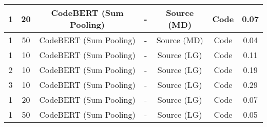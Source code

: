 \begin{longtable}{|c|c|c|c|c|c|c|}
\hline
1 & 20 & CodeBERT (Sum Pooling) & - & Source (MD) & Code & 0.07 \\
\hline
1 & 50 & CodeBERT (Sum Pooling) & - & Source (MD) & Code & 0.04 \\
\hline
1 & 10 & CodeBERT (Sum Pooling) & - & Source (LG) & Code & 0.11 \\
\hline
2 & 10 & CodeBERT (Sum Pooling) & - & Source (LG) & Code & 0.19 \\
\hline
3 & 10 & CodeBERT (Sum Pooling) & - & Source (LG) & Code & 0.29 \\
\hline
1 & 20 & CodeBERT (Sum Pooling) & - & Source (LG) & Code & 0.07 \\
\hline
1 & 50 & CodeBERT (Sum Pooling) & - & Source (LG) & Code & 0.05 \\
\hline
\end{longtable}
